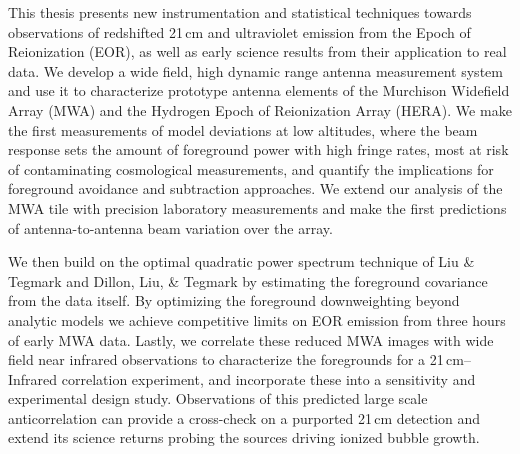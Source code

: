 % 
% 
%
This thesis presents new instrumentation and statistical techniques towards observations of redshifted 21\,cm and ultraviolet emission from the Epoch of Reionization (EOR), as well as early science results from their application to real data. We develop a wide field, high dynamic range antenna measurement system and use it to characterize prototype antenna elements of the Murchison Widefield Array (MWA) and the Hydrogen Epoch of Reionization Array (HERA). We make the first measurements of model deviations at low altitudes, where the beam response sets the amount of foreground power with high fringe rates, most at risk of contaminating cosmological measurements, and quantify the implications for foreground avoidance and subtraction approaches. We extend our analysis of the MWA tile with precision laboratory measurements and make the first predictions of antenna-to-antenna beam variation over the array. 

We then build on the optimal quadratic power spectrum technique of Liu \& Tegmark and Dillon, Liu, \& Tegmark by estimating the foreground covariance from the data itself. By optimizing the foreground downweighting beyond analytic models we achieve competitive limits on EOR emission from three hours of early MWA data. Lastly, we correlate these reduced MWA images with wide field near infrared observations to characterize the foregrounds for a 21\,cm--Infrared correlation experiment, and incorporate these into a sensitivity and experimental design study. Observations of this predicted large scale anticorrelation can provide a cross-check on a purported 21\,cm detection and extend its science returns probing the sources driving ionized bubble growth.

